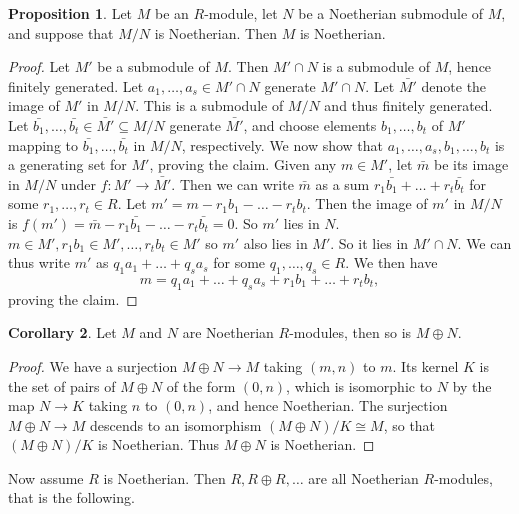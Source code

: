 \documentclass{article}
\newcommand{\rb}[1]{\left( #1 \right)}
\theoremstyle{definition}\newtheorem{definition}{Definition}[subsection]
\theoremstyle{definition}\newtheorem{remark}[definition]{Remark}
\theoremstyle{definition}\newtheorem*{example}{Example}
\theoremstyle{definition}\newtheorem*{note}{Note}
\newtheorem{proposition}[definition]{Proposition}
\newtheorem{corollary}[definition]{Corollary}
\begin{document}
\begin{proposition}
Let $ M $ be an $ R $-module, let $ N $ be a Noetherian submodule of $ M $, and suppose that $ M / N $ is Noetherian. Then $ M $ is Noetherian.
\end{proposition}

\begin{proof}
Let $ M' $ be a submodule of $ M $. Then $ M' \cap N $ is a submodule of $ M $, hence finitely generated. Let $ a_1, \dots, a_s \in M' \cap N $ generate $ M' \cap N $. Let $ \bar{M'} $ denote the image of $ M' $ in $ M / N $. This is a submodule of $ M / N $ and thus finitely generated. Let $ \bar{b_1}, \dots, \bar{b_t} \in \bar{M'} \subseteq M / N $ generate $ \bar{M'} $, and choose elements $ b_1, \dots, b_t $ of $ M' $ mapping to $ \bar{b_1}, \dots, \bar{b_t} $ in $ M / N $, respectively. We now show that $ a_1, \dots, a_s, b_1, \dots, b_t $ is a generating set for $ M' $, proving the claim. Given any $ m \in M' $, let $ \bar{m} $ be its image in $ M / N $ under $ f : M' \to \bar{M'} $. Then we can write $ \bar{m} $ as a sum $ r_1\bar{b_1} + \dots + r_t\bar{b_t} $ for some $ r_1, \dots, r_t \in R $. Let $ m' = m - r_1b_1 - \dots - r_tb_t $. Then the image of $ m' $ in $ M / N $ is $ f\rb{m'} = \bar{m} - r_1\bar{b_1} - \dots - r_t\bar{b_t} = 0 $. So $ m' $ lies in $ N $. $ m \in M', r_1b_1 \in M', \dots, r_tb_t \in M' $ so $ m' $ also lies in $ M' $. So it lies in $ M' \cap N $. We can thus write $ m' $ as $ q_1a_1 + \dots + q_sa_s $ for some $ q_1, \dots, q_s \in R $. We then have
$$ m = q_1a_1 + \dots + q_sa_s + r_1b_1 + \dots + r_tb_t, $$
proving the claim.
\end{proof}

\begin{corollary}
Let $ M $ and $ N $ are Noetherian $ R $-modules, then so is $ M \oplus N $.
\end{corollary}

\begin{proof}
We have a surjection $ M \oplus N \to M $ taking $ \rb{m, n} $ to $ m $. Its kernel $ K $ is the set of pairs of $ M \oplus N $ of the form $ \rb{0, n} $, which is isomorphic to $ N $ by the map $ N \to K $ taking $ n $ to $ \rb{0, n} $, and hence Noetherian. The surjection $ M \oplus N \to M $ descends to an isomorphism $ \rb{M \oplus N} / K \cong M $, so that $ \rb{M \oplus N} / K $ is Noetherian. Thus $ M \oplus N $ is Noetherian.
\end{proof}

Now assume $ R $ is Noetherian. Then $ R, R \oplus R, \dots $ are all Noetherian $ R $-modules, that is the following.
\end{document}

